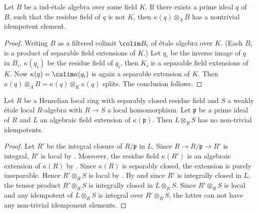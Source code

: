 \begin{lemma}
    \label{lem:idempotent-in-ind-etale-of-field-ext}
    Let $B$ be a ind-\'etale algebra over some field $K$. If there exists
    a prime ideal $q$ of $B$, such that the residue field of $q$ is not $K$, then
    $\kappa(q) \otimes_A B$ has a nontrivial idempotent element.
    \leanok
\end{lemma}

\begin{proof}
    Writing $B$ as a filtered colimit $\colim B_i$ of \'etale algebra over $K$. (Each $B_i$ is a
    product of separable field extensions of $K$.) Let $q_i$ be the inverse image of $q$ in $B_i$,
    $\kappa(q_i)$ be the residue field of $q_i$, then $K_i$ is a separable field extensions of $K$.
    Now $\kappa(q) = \colim \kappa(q_i)$ is again a separable extension of $K$. Then
    $\kappa(q) \otimes_A B = \kappa(q) \otimes_K \kappa(q)$ splits. The conclusion follows.
\end{proof}

\begin{lemma}
    Let $R$ be a Henselian local ring with separably closed residue field and $S$ a weakly étale local
    $R$-algebra with $R \to S$ a local homomorphism.
    Let $\mathfrak{p}$ be a prime ideal of $R$ and $L$ an algebraic field
    extension of $\kappa(\mathfrak{p})$. Then $L \otimes_{R} S$ has no non-trivial idempotents.
    \label{lemma:weakly-etale-over-sh-aux}
    \leanok
\end{lemma}

\begin{proof}
    Let $R'$ be the integral closure of $R / \mathfrak{p}$ in $L$. Since $R \to R / \mathfrak{p} \to R'$
    is integral, $R'$ is local by . Moreover,
    the residue field $\kappa(R')$ is an algebraic extension of $\kappa(R)$
    by . Since $\kappa(R)$ is
    separably closed, the extension is purely inseparable. Hence
    $R' \otimes_{R} S$ is local by . By
     and since $R'$ is integrally closed in $L$,
    the tensor product $R' \otimes_{R} S$ is integrally closed in $L \otimes_{R} S$.
    Since $R' \otimes_{R} S$ is local and any idempotent of $L \otimes_{R} S$ is integral over
    $R' \otimes_{R} S$, the latter can not have any non-trivial idemponent elements.
\end{proof}

